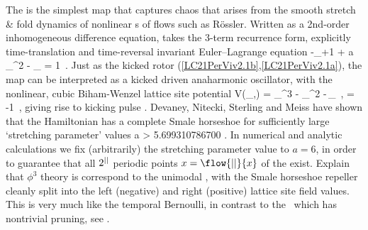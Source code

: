 The {\HenonMap} is the simplest map that captures chaos that arises from
the smooth stretch \& fold dynamics of nonlinear {\PoincMap}s of flows
such as R\"ossler.
Written as a  2nd-order inhomogeneous difference equation,
 takes the
{\em \henlatt} 3-term recurrence form, explicitly time-translation
and time-reversal invariant Euler–Lagrange equation
\beq
-\ssp_{\zeit+1} + {a}\,\ssp_{\zeit}^2 - \ssp_{} = 1
\,.
Just as the kicked rotor (\ref{LC21PerViv2.1b},\ref{LC21PerViv2.1a}), the map can
be interpreted as a kicked driven anaharmonic oscillator,
with the nonlinear, cubic Biham-Wenzel lattice site potential
\beq
V(\ssp_\zeit,\Ssym{\zeit}) =  \ssp_{\zeit}^3
                            - \ssp_{\zeit}^2 -\Ssym{\zeit}\,\ssp_\zeit
    \,,\qquad
        \Ssym{\zeit} = -1
\,,
giving rise to kicking pulse .
Devaney, Nitecki, Sterling and Meiss
have shown that the Hamiltonian {\HenonMap} has a complete Smale
horseshoe for sufficiently large `stretching parameter' values
\beq
      a > 5.699310786700\cdots
\;.
In numerical and analytic calculations we fix
(arbitrarily) the stretching parameter value to $a=6$, in order to
guarantee that all $2^{||}$ periodic points  $\ssp=\flow{\cl{}}{\ssp}$
of the {\HenonMap}  exist.
     {
Explain that $\phi^3$ theory is correspond to the unimodal \henlatt, with
the Smale horseshoe repeller cleanly split into the left (negative) and
right (positive) lattice site field values.
This is very much like the temporal Bernoulli, in contrast to the
\templatt\ which has nontrivial pruning, see .
    }

